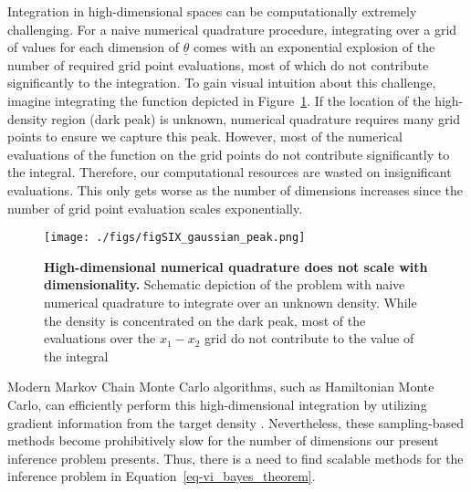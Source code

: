\documentclass[
]{scrartcl}
\begin{document}
\begin{refsegment}
Integration in high-dimensional spaces can be computationally extremely
challenging. For a naive numerical quadrature procedure, integrating
over a grid of values for each dimension of \(\underline{\theta}\) comes
with an exponential explosion of the number of required grid point
evaluations, most of which do not contribute significantly to the
integration. To gain visual intuition about this challenge, imagine
integrating the function depicted in Figure~\ref{fig-SI01}. If the
location of the high-density region (dark peak) is unknown, numerical
quadrature requires many grid points to ensure we capture this peak.
However, most of the numerical evaluations of the function on the grid
points do not contribute significantly to the integral. Therefore, our
computational resources are wasted on insignificant evaluations. This
only gets worse as the number of dimensions increases since the number
of grid point evaluation scales exponentially.

\begin{figure}

{\centering \texttt{[image: ./figs/figSIX\_gaussian\_peak.png]}

}

\caption{\label{fig-SI01}\textbf{High-dimensional numerical quadrature
does not scale with dimensionality.} Schematic depiction of the problem
with naive numerical quadrature to integrate over an unknown density.
While the density is concentrated on the dark peak, most of the
evaluations over the \(x_1-x_2\) grid do not contribute to the value of
the integral}

\end{figure}

Modern Markov Chain Monte Carlo algorithms, such as Hamiltonian Monte
Carlo, can efficiently perform this high-dimensional integration by
utilizing gradient information from the target density
\textcite{betancourt2017}. Nevertheless, these sampling-based methods
become prohibitively slow for the number of dimensions our present
inference problem presents. Thus, there is a need to find scalable
methods for the inference problem in Equation~\ref{eq-vi_bayes_theorem}.


\end{refsegment}
\end{document}
